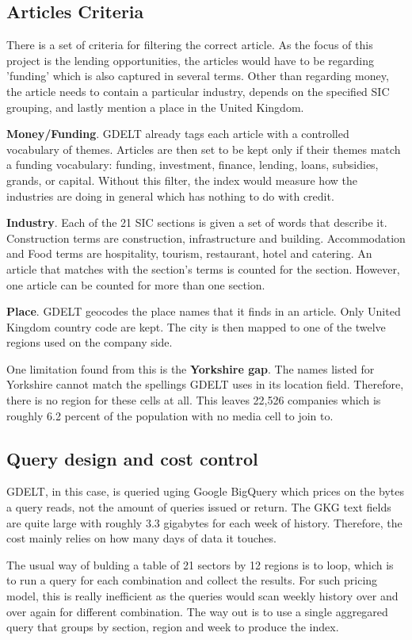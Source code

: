 \documentclass[ %
                    author={Natchalin Iwsakul \\[0.4em] Inkaphol Siriwongwattana \\[0.4em] Tanaphan Kummaraphat \\[0.6em] Patorn Srisupap},,
                supervisor={Fernando Moreno-Pino},
                    degree={MSc},
                     title={Propensity Modelling for SME Commercial Lending Using Open Public Data
},
                  subtitle={Companies House and GDELT as predictors of first-time borrowing},
                      type={},
                      year={2026}]{dissertation}
\begin{document}
  \subsection{Articles Criteria}
    There is a set of criteria for filtering the correct article. As the focus of this project is the lending opportunities, the articles would have to be regarding 'funding' which is also captured in several terms. Other than regarding money, the article needs to contain a particular industry, depends on the specified SIC grouping, and lastly mention a place in the United Kingdom.

    \textbf{Money/Funding}. GDELT already tags each article with a controlled vocabulary of themes. Articles are then set to be kept only if their themes match a funding vocabulary: funding, investment, finance, lending, loans, subsidies, grands, or capital. Without this filter, the index would measure how the industries are doing in general which has nothing to do with credit.

    \textbf{Industry}. Each of the 21 SIC sections is given a set of words that describe it. Construction terms are construction, infrastructure and building. Accommodation and Food terms are hospitality, tourism, restaurant, hotel and catering. An article that matches with the section's terms is counted for the section. However, one article can be counted for more than one section.

    \textbf{Place}. GDELT geocodes the place names that it finds in an article. Only United Kingdom country code are kept. The city is then mapped to one of the twelve regions used on the company side.

    One limitation found from this is the \textbf{Yorkshire gap}. The names listed for Yorkshire cannot match the spellings GDELT uses in its location field. Therefore, there is no region for these cells at all. This leaves 22,526 companies which is roughly 6.2 percent of the population with no media cell to join to.
  \subsection{Query design and cost control}
    GDELT, in this case, is queried uging Google BigQuery which prices on the bytes a query reads, not the amount of queries issued or return. The GKG text fields are quite large with roughly 3.3 gigabytes for each week of history. Therefore, the cost mainly relies on how many days of data it touches.

    The usual way of bulding a table of 21 sectors by 12 regions is to loop, which is to run a query for each combination and collect the results. For such pricing model, this is really inefficient as the queries would scan weekly history over and over again for different combination. The way out is to use a single aggregared query that groups by section, region and week to produce the index.
\end{document}
